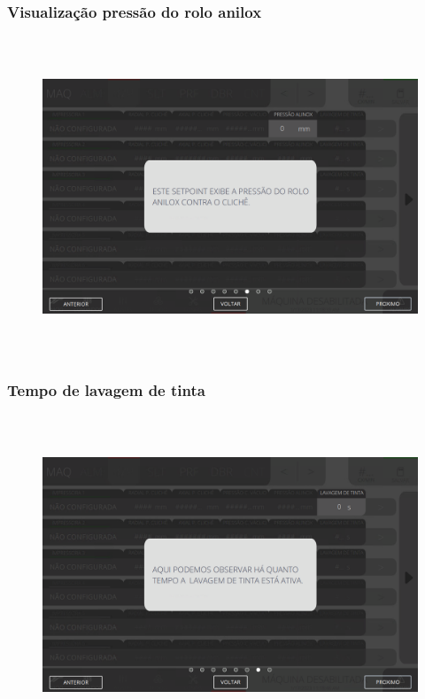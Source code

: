 \newpage
\thispagestyle{fancy}
\vspace*{\fill}
\subsubsection{\small{Visualização pressão do rolo anilox}}
\begin{figure}[h]
  \centering
  \includegraphics[width=576px,height=360px]{src/imagesFlexo/04-printter/01-printters/settings/e-6.png}
\end{figure}
\vspace*{\fill}

\newpage
\thispagestyle{fancy}
\vspace*{\fill}
\subsubsection{\small{Tempo de lavagem de tinta}}
\begin{figure}[h]
  \centering
  \includegraphics[width=576px,height=360px]{src/imagesFlexo/04-printter/01-printters/settings/e-7.png}
\end{figure}
\vspace*{\fill}

